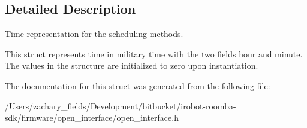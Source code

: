 \subsection{Detailed Description}
Time representation for the scheduling methods. 

This struct represents time in military time with the two fields hour and minute. The values in the structure are initialized to zero upon instantiation. 

The documentation for this struct was generated from the following file\+:\begin{DoxyCompactItemize}
\item 
/\+Users/zachary\+\_\+fields/\+Development/bitbucket/irobot-\/roomba-\/sdk/firmware/open\+\_\+interface/open\+\_\+interface.\+h\end{DoxyCompactItemize}

